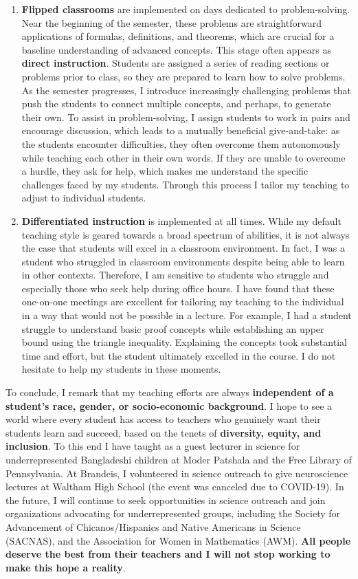 \documentclass[a4paper,11pt]{article}
\begin{document}
\begin{enumerate}
	\item \textbf{Flipped classrooms} are implemented on days dedicated to problem-solving. Near the beginning of the semester, these problems are straightforward applications of formulas, definitions, and theorems, which are crucial for a baseline understanding of advanced concepts. This stage often appears as \textbf{direct instruction}. Students are assigned a series of reading sections or problems prior to class, so they are prepared to learn how to solve problems. As the semester progresses, I introduce increasingly challenging problems that push the students to connect multiple concepts, and perhaps, to generate their own. To assist in problem-solving, I assign students to work in pairs and encourage discussion, which leads to a mutually beneficial give-and-take: as the students encounter difficulties, they often overcome them autonomously while teaching each other in their own words. If they are unable to overcome a hurdle, they ask for help, which makes me understand the specific challenges faced by my students. Through this process I tailor my teaching to adjust to individual students. 
	
	\item \textbf{Differentiated instruction} is implemented at all times. While my default teaching style is geared towards a broad spectrum of abilities, it is not always the case that students will excel in a classroom environment. In fact, I was a student who struggled in classroom environments despite being able to learn in other contexts. Therefore, I am sensitive to students who struggle and especially those who seek help during office hours. I have found that these one-on-one meetings are excellent for tailoring my teaching to the individual in a way that would not be possible in a lecture. For example, I  had a student struggle to understand basic proof concepts while establishing an upper bound using the triangle inequality. Explaining the concepts took substantial time and effort, but the student ultimately excelled in the course. I do not hesitate to help my students in these moments.
\end{enumerate}

To conclude, I remark that my teaching efforts are always \textbf{independent of a student's race, gender, or socio-economic background}. I hope to see a world where every student has access to teachers who genuinely want their students learn and succeed, based on the tenets of \textbf{diversity, equity, and inclusion}. To this end I have taught as a guest lecturer in science for underrepresented Bangladeshi children at Moder Patshala and the Free Library of Pennsylvania. At Brandeis, I volunteered in science outreach to give neuroscience lectures at Waltham High School (the event was canceled due to COVID-19). In the future, I will continue to seek opportunities in science outreach and join organizations advocating for underrepresented groups, including the Society for Advancement of Chicanos/Hispanics and Native Americans in Science (SACNAS), and the Association for Women in Mathematics (AWM). \textbf{All people deserve the best from their teachers and I will not stop working to make this hope a reality}.
\end{document}
